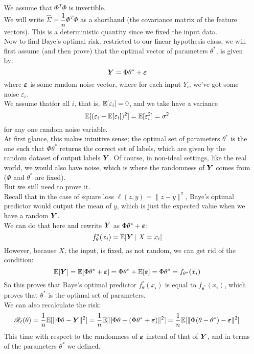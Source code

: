 \documentclass[12pt]{article}
\begin{document}
We assume that $\Phi^T\Phi$ is invertible. \\

We will write $\hat{\Sigma} = \dfrac{1}{n}\Phi^T\Phi$
as a shorthand (the covariance matrix of the feature
vectors). This is a deterministic quantity since we
fixed the input data. \\

Now to find Baye's optimal risk,
restricted to our linear hypothesis class,
we will first assume (and then prove)
that the optimal vector of parameters $\theta^*$,
is given by:
\[ \boldsymbol{Y} = \Phi \theta^* + \boldsymbol{\varepsilon} \]
where $\boldsymbol{\varepsilon}$ is some random noise vector,
where for each input $Y_i$, 
we've got some noise $\varepsilon_i$. \\
We assume thatfor all $i$,
that is, $\mathbb{E}[\varepsilon_i] = 0$,
and we take have a variance
\[ \mathbb{E}[(\varepsilon_i - \mathbb{E}[\varepsilon_i])^2]
= \mathbb{E}[\varepsilon_i^2] = \sigma^2 \]
for any one random noise variable. \\

At first glance, this makes intuitive sense;
the optimal set of parameters $\theta^*$
is the one such that $\Phi \theta^*$
returns the correct set of labels,
which are given by the random dataset
of output labels $\boldsymbol{Y}$.
Of course, in non-ideal settings,
like the real world, we would also have noise,
which is where the randomness of $\boldsymbol{Y}$
comes from ($\Phi$ and $\theta^*$ are fixed). \\
But we still need to prove it. \\

Recall that in the case of square loss
$\ell(z, y) = \|z - y\|^2$,
Baye's optimal predictor would output
the mean of $y$, which is just the expected
value when we have a random $\boldsymbol{Y}$. \\
We can do that here and rewrite $\boldsymbol{Y}$
as $\Phi \theta^* + \boldsymbol{\varepsilon}$:
\[ f_{\theta}^*(x_i)
= \mathbb{E}[\boldsymbol{Y} \mid X = x_i] \]
However, because $X$, the input, is fixed,
as not random, we can get rid of the condition:
\[ \mathbb{E}[\boldsymbol{Y}] = \mathbb{E}[\Phi \theta^* + \boldsymbol{\varepsilon}]
= \Phi \theta^* + \mathbb{E}[\boldsymbol{\varepsilon}] = \Phi \theta^* 
= f_{\theta^*}(x_i) \]
So this proves that Baye's 
optimal predictor $f_{\theta}^*(x_i)$
is equal to $f_{\theta^*}(x_i)$,
which proves that $\theta^*$
is the optimal set of parameters. \\

We can also recalculate the risk:
\[ \mathscr{R}_{\ell}{}(\theta) = 
\dfrac{1}{n}\mathbb{E}[\|\Phi \theta - \boldsymbol{Y}\|^2]
= \dfrac{1}{n}\mathbb{E}[\|\Phi \theta 
- (\Phi \theta^* + \boldsymbol{\varepsilon}) \|^2]
= \dfrac{1}{n}\mathbb{E}[\|\Phi (\theta - \theta^*) 
- \boldsymbol{\varepsilon} \|^2] \]
This time with respect to the randomness of 
$\boldsymbol{\varepsilon}$ instead of that of $\boldsymbol{Y}$,
and in terms of the parameters $\theta^*$
we defined. \\
\end{document}
